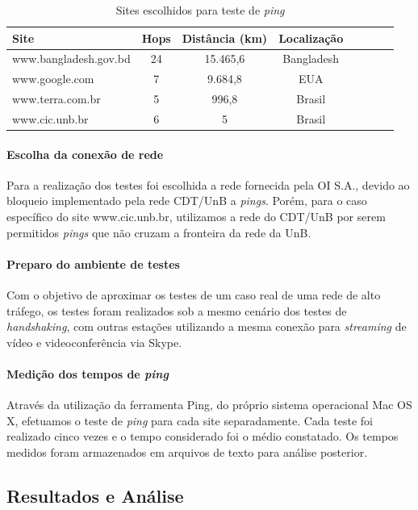 \documentclass[12pt,a4paper]{report}
\begin{document}
\begin{table}[h]
	\center
	\begin{tabular}{l*{6}{c}r}
	Site						& Hops	& Distância (km)	& Localização\\
	\hline
	www.bangladesh.gov.bd		& 24		& 15.465,6		& Bangladesh\\
	www.google.com		& 7		& 9.684,8		& EUA\\
	www.terra.com.br				& 5		& 996,8			& Brasil\\
	www.cic.unb.br				& 6		& 5				& Brasil\\
	\end{tabular}
	\caption{Sites escolhidos para teste de \textit{ping}}
	\label{tab:sitesping}
\end{table}

\paragraph{Escolha da conexão de rede} Para a realização dos testes foi escolhida a rede fornecida pela OI S.A., devido ao bloqueio implementado pela rede CDT/UnB a \textit{pings}. Porém, para o caso específico do site www.cic.unb.br, utilizamos a rede do CDT/UnB por serem permitidos \textit{pings} que não cruzam a fronteira da rede da UnB.

\paragraph{Preparo do ambiente de testes} Com o objetivo de aproximar os testes de um caso real de uma rede de alto tráfego, os testes foram realizados sob a mesmo cenário dos testes de \textit{handshaking}, com outras estações utilizando a mesma conexão para \textit{streaming} de vídeo e videoconferência via Skype.

\paragraph{Medição dos tempos de \textit{ping}} Através da utilização da ferramenta Ping, do próprio sistema operacional Mac OS X, efetuamos o teste de \textit{ping} para cada site separadamente. Cada teste foi realizado cinco vezes e o tempo considerado foi o médio constatado. Os tempos medidos foram armazenados em arquivos de texto para análise posterior.

\subsection{Resultados e Análise}
\end{document}
